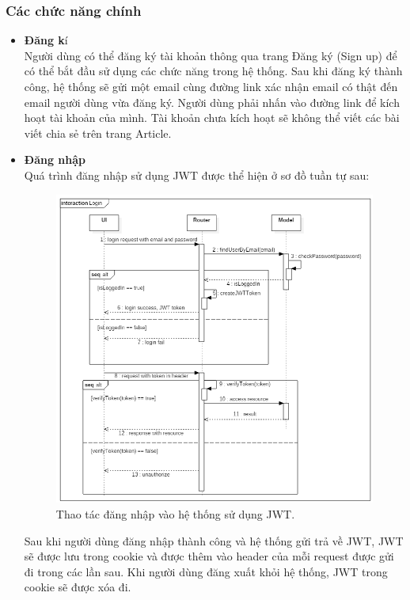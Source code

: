 \documentclass[a4paper,12pt,oneside]{article}
\begin{document}
\subsubsection{Các chức năng chính}

\begin{itemize}
	\item \textbf{Đăng k}í\\
	Người dùng có thể đăng ký tài khoản thông qua trang Đăng ký (Sign up) để có thể bắt đầu sử dụng các chức năng trong hệ thống. Sau khi đăng ký thành công, hệ thống sẽ gửi một email cùng đường link xác nhận email có thật đến email người dùng vừa đăng ký. Người dùng phải nhấn vào đường link để kích hoạt tài khoản của mình. Tài khoản chưa kích hoạt sẽ không thể viết các bài viết chia sẻ trên trang Article.
	\item \textbf{Đăng nhập}\\
	Quá trình đăng nhập sử dụng JWT được thể hiện ở sơ đồ tuần tự sau:
	
	\begin{figure}[H]
		\centering
		\includegraphics[scale=.55]{hinh/seq-login.png}
		\caption{Thao tác đăng nhập vào hệ thống sử dụng JWT.}
	\end{figure}	
	
	Sau khi người dùng đăng nhập thành công và hệ thống gửi trả về JWT, JWT sẽ được lưu trong cookie và được thêm vào header của mỗi request được gửi đi trong các lần sau. Khi người dùng đăng xuất khỏi hệ thống, JWT trong cookie sẽ được xóa đi.
	

\end{itemize}
\end{document}
